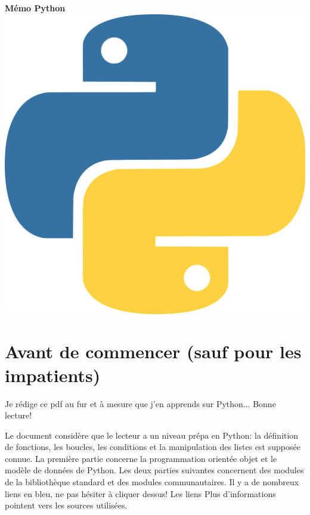 \documentclass[a4paper, 10pt]{article}
\begin{document}

\begin{center}
    {\Huge{\sc\bfseries{Mémo Python}}}\\[20pt]
    \includegraphics[scale=0.07]{python.png}
    \vspace{20pt}
\end{center}

\tableofcontents

\hypersetup{linkcolor=blue}

\newpage
\section*{Avant de commencer (sauf pour les impatients)}

Je  rédige ce pdf au fur et à mesure que j'en apprends sur Python... Bonne lecture!\medskip

Le document considère que le lecteur a un niveau \og prépa \fg{} en Python: la définition de fonctions, les boucles, les conditions et la manipulation des listes est supposée connue. La première partie concerne la programmation orientée objet et le modèle de données de Python. Les deux parties suivantes concernent des modules de la bibliothèque standard et des modules communautaires. Il y a de nombreux liens en bleu, ne pas hésiter à cliquer dessus! Les liens \og Plus d'informations \fg{} pointent vers les sources utilisées.\medskip
\end{document}
